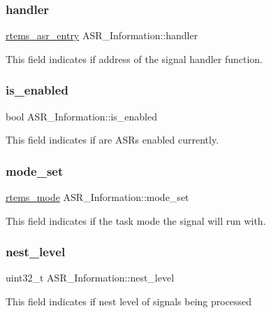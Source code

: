 \subsubsection{\texorpdfstring{handler}{handler}}
{\footnotesize\ttfamily \mbox{\hyperlink{group__ClassicASR_ga7277136adc52f70cdfd49c687ce37732}{rtems\+\_\+asr\+\_\+entry}} A\+S\+R\+\_\+\+Information\+::handler}

This field indicates if address of the signal handler function. \mbox{\label{structASR__Information_a7867fe164c596671a03b8fc9815ef30b}} 
\subsubsection{\texorpdfstring{is\_enabled}{is\_enabled}}
{\footnotesize\ttfamily bool A\+S\+R\+\_\+\+Information\+::is\+\_\+enabled}

This field indicates if are A\+S\+Rs enabled currently. \mbox{\label{structASR__Information_aeb55b502dd8bb7e8496ac16b7c76e3dc}} 
\subsubsection{\texorpdfstring{mode\_set}{mode\_set}}
{\footnotesize\ttfamily \mbox{\hyperlink{group__ClassicModes_ga8d46a41a837840dc97336fdcd20e4f68}{rtems\+\_\+mode}} A\+S\+R\+\_\+\+Information\+::mode\+\_\+set}

This field indicates if the task mode the signal will run with. \mbox{\label{structASR__Information_abe1c4f3de4c17e68b7f0474c8380828d}} 
\subsubsection{\texorpdfstring{nest\_level}{nest\_level}}
{\footnotesize\ttfamily uint32\+\_\+t A\+S\+R\+\_\+\+Information\+::nest\+\_\+level}

This field indicates if nest level of signals being processed \mbox{\label{structASR__Information_aa4b7d935b677bb59e360c58ffcb753a3}} 
